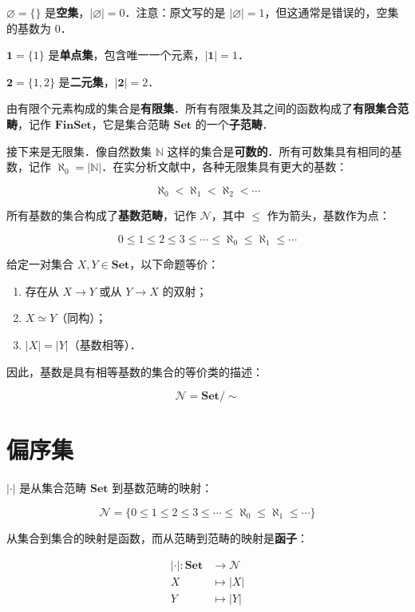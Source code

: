 \documentclass[10pt, openany]{book}
\begin{document}
$\varnothing = \{\}$ 是\textbf{空集}，$|\varnothing| = 0$．注意：原文写的是 $|\varnothing| = 1$，但这通常是错误的，空集的基数为 0．

$\textbf{1} = \{1\}$ 是\textbf{单点集}，包含唯一一个元素，$|\textbf{1}| = 1$．

$\textbf{2} = \{1,2\}$ 是\textbf{二元集}，$|\textbf{2}| = 2$．

由有限个元素构成的集合是\textbf{有限集}．所有有限集及其之间的函数构成了\textbf{有限集合范畴}，记作 $\textbf{FinSet}$，它是集合范畴 $\textbf{Set}$ 的一个\textbf{子范畴}．

接下来是无限集．像自然数集 $\mathbb N$ 这样的集合是\textbf{可数的}．所有可数集具有相同的基数，记作 $\aleph_0 = |\mathbb N|$．在实分析文献中，各种无限集具有更大的基数：

$$
\aleph_0 < \aleph_1 < \aleph_2 < \cdots
$$

所有基数的集合构成了\textbf{基数范畴}，记作 $\mathcal N$，其中 $\leq$ 作为箭头，基数作为点：

$$
0 \leq 1 \leq 2 \leq 3 \leq \cdots \leq \aleph_0 \leq \aleph_1 \leq \cdots
$$

给定一对集合 $X,Y\in\textbf{Set}$，以下命题等价：
\begin{enumerate}
    \item 存在从 $X \to Y$ 或从 $Y \to X$ 的双射；
    \item $X \simeq Y$（同构）；
    \item $|X| = |Y|$（基数相等）．
\end{enumerate}
因此，基数是具有相等基数的集合的等价类的描述：

$$
\mathcal N = \textbf{Set}/\sim
$$

\section{偏序集}

$|\cdot|$ 是从集合范畴 $\textbf{Set}$ 到基数范畴的映射：

$$
\mathcal N = \{ 0 \leq 1 \leq 2 \leq 3 \leq \cdots \leq \aleph_0 \leq \aleph_1 \leq \cdots \}
$$

从集合到集合的映射是函数，而从范畴到范畴的映射是\textbf{函子}：

$$
\begin{aligned}
|\cdot|: \textbf{Set} &\to \mathcal N \\
X &\mapsto |X| \\
Y &\mapsto |Y|
\end{aligned}
$$
\end{document}
